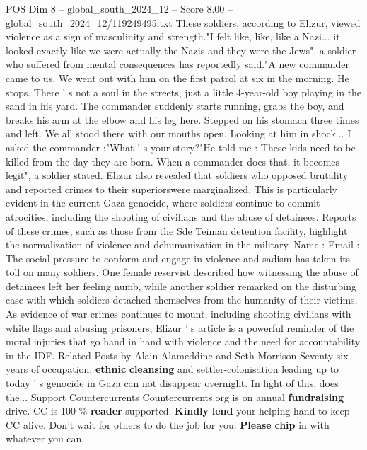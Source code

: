\begin{textsample}{POS Dim 8 – global\_south\_2024\_12 – Score 8.00 – global\_south\_2024\_12/119249495.txt}
These soldiers, according to Elizur, viewed violence as a sign of masculinity and strength."I felt like, like, like a Nazi... it looked exactly like we were actually the Nazis and they were the Jews", a soldier who suffered from mental consequences has reportedly said."A new commander came to us.
We went out with him on the first patrol at six in the morning.
He stops.
There ' s not a soul in the streets, just a little 4-year-old boy playing in the sand in his yard.
The commander suddenly starts running, grabs the boy, and breaks his arm at the elbow and his leg here.
Stepped on his stomach three times and left.
We all stood there with our mouths open.
Looking at him in shock...
I asked the commander :"What ' s your story?"He told me : These kids need to be killed from the day they are born.
When a commander does that, it becomes legit", a soldier stated.
Elizur also revealed that soldiers who opposed brutality and reported crimes to their superiorswere marginalized.
This is particularly evident in the current Gaza genocide, where soldiers continue to commit atrocities, including the shooting of civilians and the abuse of detainees.
Reports of these crimes, such as those from the Sde Teiman detention facility, highlight the normalization of violence and dehumanization in the military.
Name : Email : The social pressure to conform and engage in violence and sadism has taken its toll on many soldiers.
One female reservist described how witnessing the abuse of detainees left her feeling numb, while another soldier remarked on the disturbing ease with which soldiers detached themselves from the humanity of their victims.
As evidence of war crimes continues to mount, including shooting civilians with white flags and abusing prisoners, Elizur ' s article is a powerful reminder of the moral injuries that go hand in hand with violence and the need for accountability in the IDF.
Related Posts by Alain Alameddine and Seth Morrison Seventy-six years of occupation, \textbf{ethnic} \textbf{cleansing} and settler-colonisation leading up to today ' s genocide in Gaza can not disappear overnight.
In light of this, does the...
Support Countercurrents Countercurrents.org is on annual \textbf{fundraising} drive.
CC is 100 \% \textbf{reader} supported. \textbf{Kindly} \textbf{lend} your helping hand to keep CC alive.
Don't wait for others to do the job for you. \textbf{Please} \textbf{chip} in with whatever you can.

\end{textsample}
